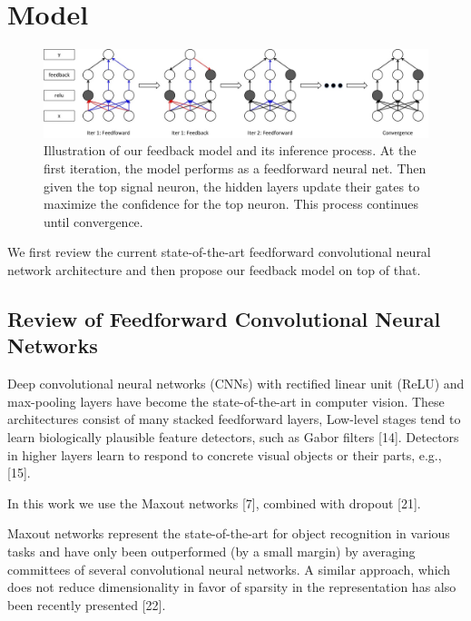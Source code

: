 \section{Model}
\label{sec:model}

\setlength{\tabcolsep}{2pt}
\begin{figure}
\begin{center}
\includegraphics[width=0.95\linewidth]{figs/model/model}
\caption{Illustration of our feedback model and its inference process. At the first iteration, the model performs as a feedforward neural net. Then given the top signal neuron, the hidden layers update their gates to maximize the confidence for the top neuron. This process continues until convergence.}
\label{fig:visual_compare}
\end{center}
\end{figure}

We first review the current state-of-the-art feedforward convolutional neural network architecture and then propose our feedback model on top of that. 

\subsection{Review of Feedforward Convolutional Neural Networks}
Deep convolutional neural networks (CNNs) with rectified linear unit (ReLU) and max-pooling layers have become the state-of-the-art in computer vision. These architectures consist of many stacked feedforward layers, Low-level stages tend to learn biologically plausible feature detectors, such as Gabor filters [14]. Detectors in higher layers learn to respond to concrete visual objects or their parts, e.g., [15].

In this work we use the Maxout networks [7], combined with dropout [21]. 

Maxout networks represent the state-of-the-art for object recognition in various tasks and have only been outperformed (by a small margin) by averaging committees of several convolutional neural networks. 
A similar approach, which does not reduce dimensionality in favor of sparsity in the representation has also been recently presented [22]. 

